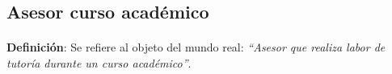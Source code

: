 \subsection{Asesor curso académico}

  \paragraph{}\textbf{Definición}: Se refiere al objeto del mundo real:
  \emph{``Asesor que realiza labor de tutoría durante un curso académico''}.



